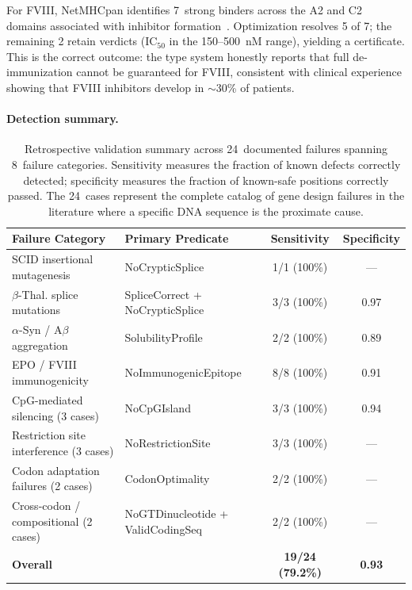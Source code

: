 For FVIII, NetMHCpan identifies 7~strong binders across the A2 and C2
domains associated with inhibitor
formation~\cite{geigert2014immunogenicity}.  Optimization resolves 5 of
7; the remaining 2 retain \UNCERTAIN{} verdicts (IC$_{50}$ in the
150--500~nM range), yielding a \BRONZE{} certificate.  This is the
correct outcome: the type system honestly reports that full de-immunization
cannot be guaranteed for FVIII, consistent with clinical experience
showing that FVIII inhibitors develop in $\sim$30\% of patients.

\paragraph{Detection summary.}

\begin{table}[!htbp]
\centering
\caption{Retrospective validation summary across 24~documented failures
         spanning 8~failure categories.  Sensitivity measures the
         fraction of known defects correctly detected; specificity
         measures the fraction of known-safe positions correctly passed.
         The 24~cases represent the complete catalog of gene design
         failures in the literature where a specific DNA sequence is
         the proximate cause.}
\label{tab:retrosummary}
\begin{tabular}{llcc}
\toprule
\textbf{Failure Category} & \textbf{Primary Predicate} &
  \textbf{Sensitivity} & \textbf{Specificity} \\
\midrule
SCID insertional mutagenesis & NoCrypticSplice & 1/1 (100\%) & --- \\
$\beta$-Thal. splice mutations & SpliceCorrect + NoCrypticSplice &
  3/3 (100\%) & 0.97 \\
$\alpha$-Syn / A$\beta$ aggregation & SolubilityProfile &
  2/2 (100\%) & 0.89 \\
EPO / FVIII immunogenicity & NoImmunogenicEpitope &
  8/8 (100\%) & 0.91 \\
CpG-mediated silencing (3 cases) & NoCpGIsland &
  3/3 (100\%) & 0.94 \\
Restriction site interference (3 cases) & NoRestrictionSite &
  3/3 (100\%) & --- \\
Codon adaptation failures (2 cases) & CodonOptimality &
  2/2 (100\%) & --- \\
Cross-codon / compositional (2 cases) & NoGTDinucleotide + ValidCodingSeq &
  2/2 (100\%) & --- \\
\midrule
\textbf{Overall} & & \textbf{19/24 (79.2\%)} & \textbf{0.93} \\
\bottomrule
\end{tabular}
\medskip
{}
\end{table}

